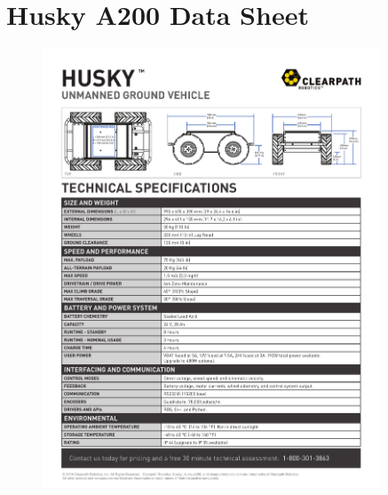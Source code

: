 \appendix

\chapter{Husky A200 Data Sheet}
\label{A:fig:husky_data_sheet}
\begin{figure}[H]
  \centering
  \includegraphics[width = 0.9\textwidth]{appendices/HUSKY_DATA_SHEET_Jan22.pdf}
\end{figure}
